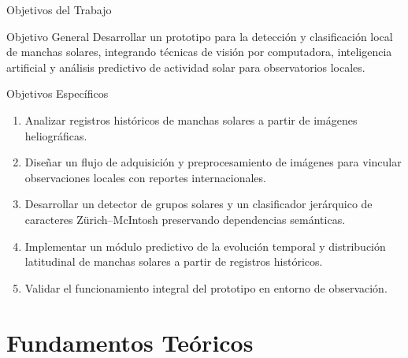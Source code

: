 \documentclass[aspectratio=169]{beamer}
\makeatletter
\newcounter{prismfigure}
\renewcommand{\theprismfigure}{\arabic{prismfigure}}
\let\prism@original@includegraphics\includegraphics
\renewcommand{\includegraphics}[2][]{%
    \prism@original@includegraphics[#1]{#2}%
    \refstepcounter{prismfigure}%
    \label{fig:auto-\theprismfigure}%
}
\makeatother
\begin{document}
\begin{frame}{Objetivos del Trabajo}
    \begin{block}{Objetivo General}
        \scriptsize
        Desarrollar un prototipo para la detección y clasificación local de manchas solares, integrando técnicas de visión por computadora, inteligencia artificial y análisis predictivo de actividad solar para observatorios locales.
    \end{block}

    \vspace{0.1cm}
    \begin{block}{Objetivos Específicos}
        \scriptsize
        \begin{enumerate}
            \item Analizar registros históricos de manchas solares a partir de imágenes heliográficas.
            \item Diseñar un flujo de adquisición y preprocesamiento de imágenes para vincular observaciones locales con reportes internacionales.
            \item Desarrollar un detector de grupos solares y un clasificador jerárquico de caracteres Zürich--McIntosh preservando dependencias semánticas.
            \item Implementar un módulo predictivo de la evolución temporal y distribución latitudinal de manchas solares a partir de registros históricos.
            \item Validar el funcionamiento integral del prototipo en entorno de observación.
        \end{enumerate}
    \end{block}
\end{frame}

\section{Fundamentos Teóricos}

    
    
\end{document}
